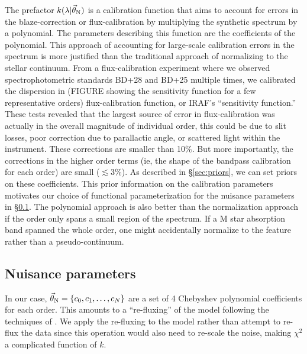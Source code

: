 \documentclass[preprint]{aastex} %
\newcommand{\vt}{\vec{\theta}}
\newcommand{\vN}{\vt_{\rm N}}
\begin{document}
The prefactor $k(\lambda | \vN)$ is a calibration function that aims to account for errors in the blaze-correction or flux-calibration by multiplying the synthetic spectrum by a polynomial. The parameters describing this function are the coefficients of the polynomial. This approach of accounting for large-scale calibration errors in the spectrum is more justified than the traditional approach of normalizing to the stellar continuum. From a flux-calibration experiment where we observed spectrophotometric standards BD+28 and BD+25 multiple times, we calibrated the dispersion in (FIGURE showing the sensitivity function for a few representative orders) flux-calibration function, or IRAF's ``sensitivity function.'' These tests revealed that the largest source of error in flux-calibration was actually in the overall magnitude of individual order, this could be due to slit losses, poor correction due to parallactic angle, or scattered light within the instrument. These corrections are smaller than 10\%. But more importantly, the corrections in the higher order terms (ie, the shape of the bandpass calibration for each order) are small ($\lesssim 3\%$). As described in \S\ref{sec:priors}, we can set priors on these coefficients. This prior information on the calibration parameters motivates our choice of functional parameterization for the nuisance parameters in \S\ref{sec:nuisance}.
The polynomial approach is also better than the normalization approach if the order only spans a small region of the spectrum. If a M star absorption band spanned the whole order, one might accidentally normalize to the feature rather than a pseudo-continuum.


\subsection{Nuisance parameters}
\label{sec:nuisance}
In our case, $\vN = \{c_0, c_1, \ldots, c_N\}$ are a set of 4 Chebyshev polynomial coefficients for each order. This amounts to a ``re-fluxing'' of the model following the techniques of \citet{elh+06}. We apply the re-fluxing to the model rather than attempt to re-flux the data since this operation would also need to re-scale the noise, making $\chi^2$ a complicated function of $k$.
\end{document}
